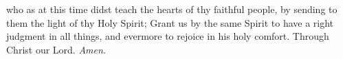 \clearpage
{}
{} who as at this time didst teach the hearts of thy faithful people, by sending to them the light of thy Holy Spirit; Grant us by the same Spirit to have a right judgment in all things, and evermore to rejoice in his holy comfort. Through Christ our Lord. \textit{Amen.}%


























